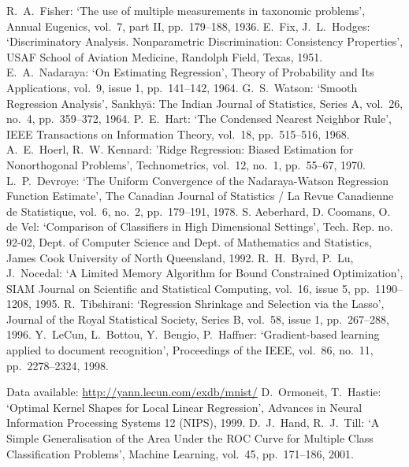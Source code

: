 \cleardoublepage
{}
{}
\begin{thebibliography}{99}
R.\ A.\ Fisher: `The use of multiple measurements in taxonomic problems', Annual Eugenics, vol.\ 7, part II, pp.\ 179--188, 1936.
%
E.\ Fix, J.\ L.\ Hodges: `Discriminatory Analysis. Nonparametric Discrimination: Consistency Properties', USAF School of Aviation Medicine, Randolph Field, Texas, 1951.
%
E.\ A.\ Nadaraya: `On Estimating Regression', Theory of Probability and Its Applications, vol.\ 9, issue 1, pp.\ 141--142, 1964.
%
G.\ S.\ Watson: `Smooth Regression Analysis', Sankhyā: The Indian Journal of Statistics, Series A, vol.\ 26, no.\ 4, pp.\ 359--372, 1964.
%
P.\ E.\ Hart: `The Condensed Nearest Neighbor Rule', IEEE Transactions on Information Theory, vol.\ 18, pp.\ 515–516, 1968.
%
A.\ E.\ Hoerl, R.\ W. Kennard: 'Ridge Regression: Biased Estimation for Nonorthogonal Problems', Technometrics, vol.\ 12, no.\ 1, pp.\ 55--67, 1970.
%
L.\ P.\ Devroye: `The Uniform Convergence of the Nadaraya-Watson Regression Function Estimate', The Canadian Journal of Statistics / La Revue Canadienne de Statistique, vol.\ 6, no.\ 2, pp.\ 179--191, 1978.
%
S. Aeberhard, D. Coomans, O. de Vel: `Comparison of Classifiers in High Dimensional Settings', Tech. Rep. no. 92-02, Dept. of Computer Science and Dept. of Mathematics and Statistics, James Cook University of North Queensland, 1992. 
%
R.\ H.\ Byrd, P.\ Lu, J.\ Nocedal: `A Limited Memory Algorithm for Bound Constrained Optimization', SIAM Journal on Scientific and Statistical Computing, vol.\ 16, issue 5, pp.\ 1190--1208, 1995.
%
R.\ Tibshirani: `Regression Shrinkage and Selection via the Lasso', Journal of the Royal Statistical Society, Series B, vol.\ 58, issue 1, pp.\ 267--288, 1996.
%
Y.\ LeCun, L.\ Bottou, Y.\ Bengio, P.\ Haffner: `Gradient-based learning applied to document recognition', Proceedings of the IEEE, vol.\ 86, no.\ 11, pp.\ 2278--2324, 1998.\par
%
Data available: \url{http://yann.lecun.com/exdb/mnist/}
%
D.\ Ormoneit, T.\ Hastie: `Optimal Kernel Shapes for Local Linear Regression', Advances in Neural Information Processing Systems 12 (NIPS), 1999.
%
D.\ J.\ Hand, R.\ J.\ Till: `A Simple Generalisation of the Area Under the ROC Curve for Multiple Class Classification Problems', Machine Learning, vol.\ 45, pp.\ 171--186, 2001.

\end{thebibliography}
